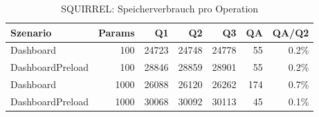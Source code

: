 \begin{table}[ht]
\centering
\caption{SQUIRREL: Speicherverbrauch pro Operation}
\begin{tabular}{lrrrrrr}
\toprule
Szenario & Params & Q1 & Q2 & Q3 & QA & QA/Q2 \\
\midrule
		Dashboard & 100 & 24723 & 24748 & 24778 & 55 & 0.2\% \\
		DashboardPreload & 100 & 28846 & 28859 & 28901 & 55 & 0.2\% \\
		Dashboard & 1000 & 26088 & 26120 & 26262 & 174 & 0.7\% \\
		DashboardPreload & 1000 & 30068 & 30092 & 30113 & 45 & 0.1\% \\
\bottomrule
\end{tabular}
\label{tab:benchmark_squirrel_bytesperop}
\end{table}
	